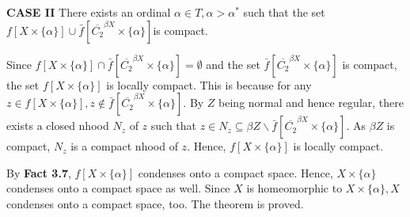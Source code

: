\documentclass{article}
\begin{document}
\vskip 25pt

\textbf{CASE II} There exists an ordinal $\alpha \in T, \alpha>\alpha^*$ such that the set $f\left[X\times\{\alpha\}\right] \cup \bar{f}\left[\overline{C_2}^{\beta X} \times \{\alpha\}\right] $is compact. 

\vskip 10pt

Since $f\left[X\times\{\alpha\}\right] \cap \bar{f}\left[\overline{C_2}^{\beta X} \times \{\alpha\}\right]=\emptyset$ and the set 
$\bar{f}\left[\overline{C_2}^{\beta X} \times \{\alpha\}\right]$ is compact, the set $f\left[X\times\{\alpha\}\right]$ is locally compact. This is because for any $z\in f\left[X\times\{\alpha\}\right], z\notin \bar{f}\left[\overline{C_2}^{\beta X} \times \{\alpha\}\right]$. By $Z$ being normal and hence regular, there exists a closed nhood $N_z$ of $z$ such that $z\in N_z\subseteq \beta Z\backslash \bar{f}\left[\overline{C_2}^{\beta X} \times \{\alpha\}\right].$ As $\beta Z$ is compact, $N_z$ is a compact nhood of $z$. Hence, $f\left[X\times\{\alpha\}\right]$ is locally compact.
\vskip 10pt

By \textbf{Fact 3.7}, $f\left[X\times\{\alpha\}\right]$ condenses onto a compact space. Hence, $X\times\{\alpha\}$ condenses onto a compact space as well. Since $X$ is homeomorphic to $X\times \{\alpha\}, X$ condenses onto a compact space, too. The theorem is proved. 
 
\end{document}
